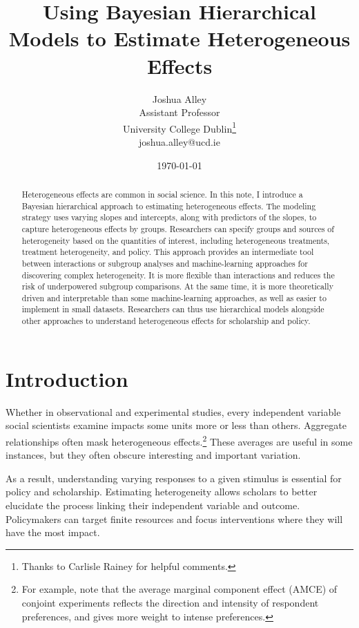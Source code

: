 \documentclass[12pt]{article}
\title{\textbf{Using Bayesian Hierarchical Models to Estimate Heterogeneous Effects}}
\author{Joshua Alley \\
Assistant Professor \\
University College Dublin\thanks{Thanks to Carlisle Rainey for helpful comments.} \\
joshua.alley@ucd.ie
}
\date{\today}
\begin{document}
\maketitle 

\begin{abstract} 
Heterogeneous effects are common in social science. 
In this note, I introduce a Bayesian hierarchical approach to estimating heterogeneous effects. 
The modeling strategy uses varying slopes and intercepts, along with predictors of the slopes, to capture heterogeneous effects by groups.  
Researchers can specify groups and sources of heterogeneity based on the quantities of interest, including heterogeneous treatments, treatment heterogeneity, and policy.  
This approach provides an intermediate tool between interactions or subgroup analyses and machine-learning approaches for discovering complex heterogeneity. 
It is more flexible than interactions and reduces the risk of underpowered subgroup comparisons.
At the same time, it is more theoretically driven and interpretable than some machine-learning approaches, as well as easier to implement in small datasets. 
Researchers can thus use hierarchical models alongside other approaches to understand heterogeneous effects for scholarship and policy.
\end{abstract} 


\newpage 
\doublespace 


\section{Introduction}


Whether in observational and experimental studies, every independent variable social scientists examine impacts some units more or less than others. 
Aggregate relationships often mask heterogeneous effects.\footnote{For example, \citet{Abramsonetal2022} note that the average marginal component effect (AMCE) of conjoint experiments reflects the direction and intensity of respondent preferences, and gives more weight to intense preferences.} 
These averages are useful in some instances, but they often obscure interesting and important variation. 


As a result, understanding varying responses to a given stimulus is essential for policy and scholarship. 
Estimating heterogeneity allows scholars to better elucidate the process linking their independent variable and outcome.
Policymakers can target finite resources and focus interventions where they will have the most impact. 
\end{document}
